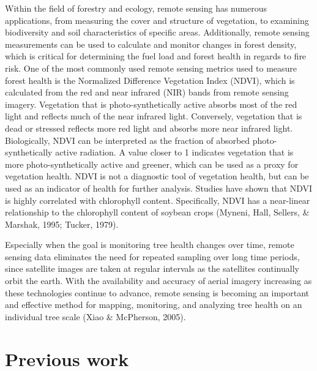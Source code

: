 \documentclass[12pt,twoside]{reedthesis}
\begin{document}
Within the field of forestry and ecology, remote sensing has numerous
applications, from measuring the cover and structure of vegetation, to
examining biodiversity and soil characteristics of specific areas.
Additionally, remote sensing measurements can be used to calculate and
monitor changes in forest density, which is critical for determining the
fuel load and forest health in regards to fire risk. One of the most
commonly used remote sensing metrics used to measure forest health is
the Normalized Difference Vegetation Index (NDVI), which is calculated
from the red and near infrared (NIR) bands from remote sensing imagery.
Vegetation that is photo-synthetically active absorbs most of the red
light and reflects much of the near infrared light. Conversely,
vegetation that is dead or stressed reflects more red light and absorbs
more near infrared light. Biologically, NDVI can be interpreted as the
fraction of absorbed photo-synthetically active radiation. A value
closer to 1 indicates vegetation that is more photo-synthetically active
and greener, which can be used as a proxy for vegetation health. NDVI is
not a diagnostic tool of vegetation health, but can be used as an
indicator of health for further analysis. Studies have shown that NDVI
is highly correlated with chlorophyll content. Specifically, NDVI has a
near-linear relationship to the chlorophyll content of soybean crops
(Myneni, Hall, Sellers, \& Marshak, 1995; Tucker, 1979).

Especially when the goal is monitoring tree health changes over time,
remote sensing data eliminates the need for repeated sampling over long
time periods, since satellite images are taken at regular intervals as
the satellites continually orbit the earth. With the availability and
accuracy of aerial imagery increasing as these technologies continue to
advance, remote sensing is becoming an important and effective method
for mapping, monitoring, and analyzing tree health on an individual tree
scale (Xiao \& McPherson, 2005).

\hypertarget{previous-work}{%
\section{Previous work}\label{previous-work}}
\end{document}
